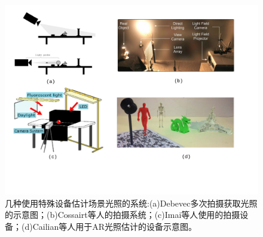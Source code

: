 \begin{figure}[!htbp]
    \centering
    \includegraphics[width=1.0\textwidth]{Img/estimation-using-devices.pdf}

    \caption[使用特殊设备估计光照]
    {几种使用特殊设备估计场景光照的系统:(a)Debevec\cite{debevec1998rendering}多次拍摄获取光照的示意图；(b)Cossairt等人\cite{cossairt2008light}的拍摄系统；(c)Imai等人\cite{imai2011estimation}使用的拍摄设备；(d)Cailian等人\cite{calian2013shading}用于AR光照估计的设备示意图。}
    
    \label{fig:estimation-using-devices}
\end{figure}